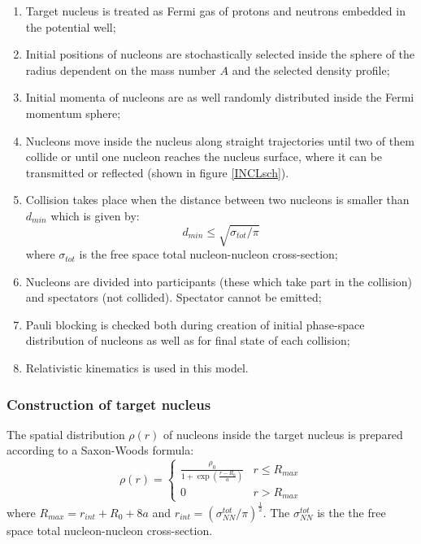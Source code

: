 \begin{enumerate}[label=(\roman*)] 
	
	\item Target nucleus is treated as Fermi gas of protons and neutrons embedded in the potential well;
	\item Initial positions of nucleons are stochastically selected inside the sphere of the radius dependent on the mass number $A$ 
	and the selected density profile;
	\item Initial momenta of nucleons are as well randomly distributed inside the Fermi momentum sphere;	
	\item Nucleons move inside the nucleus along straight trajectories until two of them collide 
	or until one nucleon reaches the nucleus surface, where it can be transmitted or reflected (shown in figure \ref{INCLsch}).
	\item Collision takes place when the distance between two nucleons is smaller than $d_{min}$ which is given by:
	\begin{equation}
		d_{min}\leq\sqrt{\sigma_{tot}/\pi}
	\end{equation}
	where $\sigma_{tot}$ is the free space total nucleon-nucleon cross-section;	
	\item Nucleons are divided into participants (these which take part in the collision) and spectators (not collided). Spectator cannot be emitted; 
	\item Pauli blocking is checked both during creation of initial phase-space distribution of nucleons as well as for final state of each collision; 
    \item Relativistic kinematics is used in this model.
\end{enumerate}


\subsubsection{Construction of target nucleus}\label{TargetNucleus}
The spatial distribution $\rho (r)$ of nucleons inside the target nucleus is prepared according 
to a Saxon-Woods formula:
\begin{equation}
	\rho (r)= \begin{cases} \frac{\rho_{0}}{1+\exp(\frac{r-R_{0}}{a})} &  r \leq R_{max}\\ 
		0 &  r> R_{max} \end{cases} 
\end{equation}
where $R_{max}=r_{int} + R_{0} + 8a$ and $r_{int}=(\sigma_{NN}^{tot}/\pi)^\frac{1}{2}$. 
The $\sigma_{NN}^{tot}$ is the the free space total  nucleon-nucleon cross-section.

